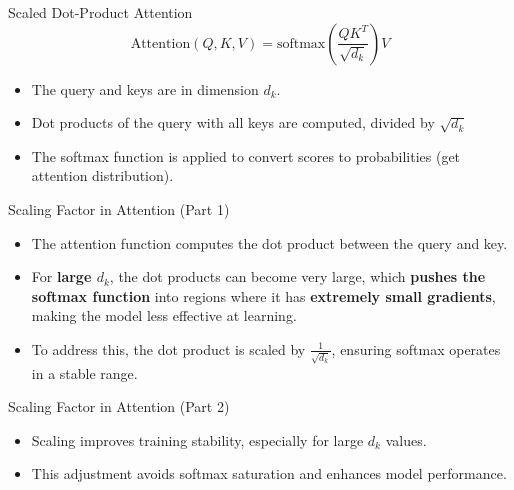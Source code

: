 \documentclass[serif, aspectratio=169]{beamer}
\begin{document}
\begin{frame}{Scaled Dot-Product Attention}
	\begin{equation*}
		\text{Attention}(Q, K, V) = \text{softmax}\left(\frac{QK^T}{\sqrt{d_k}}\right)V
	\end{equation*}
	\begin{itemize}
		\item The query and keys are in dimension $d_k$.
		\item Dot products of the query with all keys are computed, divided by $\sqrt{d_k}$
		\item The softmax function is applied to convert scores to probabilities (get attention distribution).
	\end{itemize}
	
\end{frame}

\begin{frame}{Scaling Factor in Attention (Part 1)}
	\begin{itemize}
		\item The attention function computes the dot product between the query and key. 
		\item For \textbf{large $d_k$}, the dot products can become very large, which \textbf{pushes the softmax function} into regions where it has \textbf{extremely small gradients}, making the model less effective at learning.
		\item To address this, the dot product is scaled by $\frac{1}{\sqrt{d_k}}$, ensuring softmax operates in a stable range.
	\end{itemize}
\end{frame}

\begin{frame}{Scaling Factor in Attention (Part 2)}
	\begin{itemize}
		\item Scaling improves training stability, especially for large $d_k$ values.
		\item This adjustment avoids softmax saturation and enhances model performance.
	\end{itemize}
\end{frame}
\end{document}
